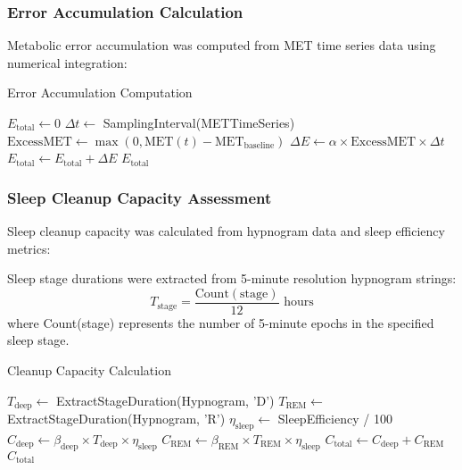 \subsubsection{Error Accumulation Calculation}

Metabolic error accumulation was computed from MET time series data using numerical integration:

\begin{algorithm}
\caption{Error Accumulation Computation}
\begin{algorithmic}
    \State $E_{\text{total}} \leftarrow 0$
    \State $\Delta t \leftarrow$ SamplingInterval(METTimeSeries)
        \State $\text{ExcessMET} \leftarrow \max(0, \text{MET}(t) - \text{MET}_{\text{baseline}})$
        \State $\Delta E \leftarrow \alpha \times \text{ExcessMET} \times \Delta t$
        \State $E_{\text{total}} \leftarrow E_{\text{total}} + \Delta E$
    \EndFor
    \State \Return $E_{\text{total}}$
\EndProcedure
\end{algorithmic}
\end{algorithm}

\subsubsection{Sleep Cleanup Capacity Assessment}

Sleep cleanup capacity was calculated from hypnogram data and sleep efficiency metrics:

\begin{definition}
Sleep stage durations were extracted from 5-minute resolution hypnogram strings:
\begin{equation}
T_{\text{stage}} = \frac{\text{Count}(\text{stage})}{12} \text{ hours}
\end{equation}
where Count(stage) represents the number of 5-minute epochs in the specified sleep stage.
\end{definition}

\begin{algorithm}
\caption{Cleanup Capacity Calculation}
\begin{algorithmic}
    \State $T_{\text{deep}} \leftarrow$ ExtractStageDuration(Hypnogram, 'D')
    \State $T_{\text{REM}} \leftarrow$ ExtractStageDuration(Hypnogram, 'R')
    \State $\eta_{\text{sleep}} \leftarrow$ SleepEfficiency / 100
    \State $C_{\text{deep}} \leftarrow \beta_{\text{deep}} \times T_{\text{deep}} \times \eta_{\text{sleep}}$
    \State $C_{\text{REM}} \leftarrow \beta_{\text{REM}} \times T_{\text{REM}} \times \eta_{\text{sleep}}$
    \State $C_{\text{total}} \leftarrow C_{\text{deep}} + C_{\text{REM}}$
    \State \Return $C_{\text{total}}$
\EndProcedure
\end{algorithmic}
\end{algorithm}


